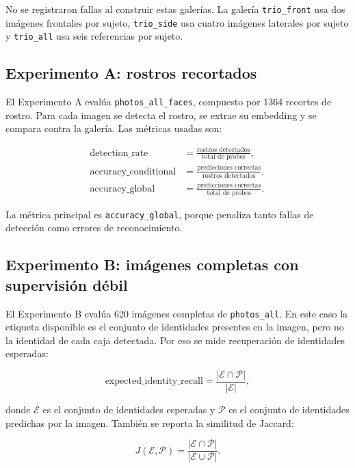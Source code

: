 \documentclass[11pt]{article}
\newcommand{\accglobal}{\texttt{accuracy\_global}}
\begin{document}
No se registraron fallas al construir estas galer\'ias. La galer\'ia \texttt{trio\_front} usa dos im\'agenes frontales por sujeto, \texttt{trio\_side} usa cuatro im\'agenes laterales por sujeto y \texttt{trio\_all} usa seis referencias por sujeto.

\subsection{Experimento A: rostros recortados}

El Experimento A eval\'ua \texttt{photos\_all\_faces}, compuesto por 1364 recortes de rostro. Para cada imagen se detecta el rostro, se extrae su embedding y se compara contra la galer\'ia. Las m\'etricas usadas son:

\begin{align}
    \text{detection\_rate} &=
    \frac{\text{rostros detectados}}{\text{total de probes}},\\
    \text{accuracy\_conditional} &=
    \frac{\text{predicciones correctas}}{\text{rostros detectados}},\\
    \text{accuracy\_global} &=
    \frac{\text{predicciones correctas}}{\text{total de probes}}.
\end{align}

La m\'etrica principal es \accglobal{}, porque penaliza tanto fallas de detecci\'on como errores de reconocimiento.

\subsection{Experimento B: im\'agenes completas con supervisi\'on d\'ebil}

El Experimento B eval\'ua 620 im\'agenes completas de \texttt{photos\_all}. En este caso la etiqueta disponible es el conjunto de identidades presentes en la imagen, pero no la identidad de cada caja detectada. Por eso se mide recuperaci\'on de identidades esperadas:

\begin{equation}
    \text{expected\_identity\_recall}
    =
    \frac{|\mathcal{E} \cap \mathcal{P}|}{|\mathcal{E}|},
\end{equation}

donde $\mathcal{E}$ es el conjunto de identidades esperadas y $\mathcal{P}$ es el conjunto de identidades predichas por la imagen. Tambi\'en se reporta la similitud de Jaccard:

\begin{equation}
    J(\mathcal{E}, \mathcal{P}) =
    \frac{|\mathcal{E} \cap \mathcal{P}|}{|\mathcal{E} \cup \mathcal{P}|}.
\end{equation}
\end{document}

